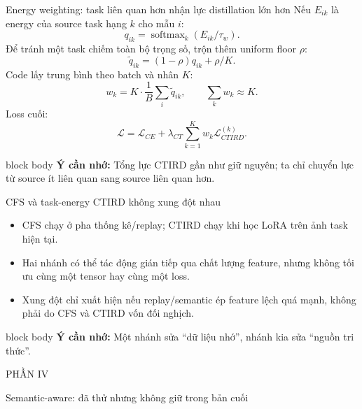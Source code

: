\documentclass[aspectratio=169,11pt]{beamer}
\newcommand{\remember}[1]{%
  \vfill
  \begin{beamercolorbox}[wd=\textwidth,sep=0.22cm,rounded=true]{block body}
    \textbf{Ý cần nhớ:} #1
  \end{beamercolorbox}
}
\newcommand{\sectionframe}[2]{%
  \begin{frame}[plain]
    \vfill
    {\large\color{HRMBlue}#1}\par\vspace{0.35cm}
    {\Huge\color{HRMDark}#2}\par
    \vfill
  \end{frame}
}
\begin{document}
\begin{frame}{Energy weighting: task liên quan hơn nhận lực distillation lớn hơn}
  Nếu $E_{ik}$ là energy của source task hạng $k$ cho mẫu $i$:
  \[
    q_{ik}=\operatorname{softmax}_k(E_{ik}/\tau_w).
  \]
  Để tránh một task chiếm toàn bộ trọng số, trộn thêm uniform floor $\rho$:
  \[
    \tilde q_{ik}=(1-\rho)q_{ik}+\rho/K.
  \]
  Code lấy trung bình theo batch và nhân $K$:
  \[
    w_k=K\cdot\frac{1}{B}\sum_i\tilde q_{ik},
    \qquad \sum_k w_k\approx K.
  \]
  Loss cuối:
  \[
    \mathcal L=\mathcal L_{CE}+\lambda_{CT}\sum_{k=1}^{K}w_k\mathcal L_{CTIRD}^{(k)}.
  \]
  \remember{Tổng lực CTIRD gần như giữ nguyên; ta chỉ chuyển lực từ source ít liên quan sang source liên quan hơn.}
\end{frame}

\begin{frame}{CFS và task-energy CTIRD không xung đột nhau}
  \centering

  \vspace{0.45cm}
  \begin{itemize}\setlength\itemsep{0.25cm}
    \item CFS chạy ở pha thống kê/replay; CTIRD chạy khi học LoRA trên ảnh task hiện tại.
    \item Hai nhánh có thể tác động gián tiếp qua chất lượng feature, nhưng không tối ưu cùng một tensor hay cùng một loss.
    \item Xung đột chỉ xuất hiện nếu replay/semantic ép feature lệch quá mạnh, không phải do CFS và CTIRD vốn đối nghịch.
  \end{itemize}
  \remember{Một nhánh sửa ``dữ liệu nhớ'', nhánh kia sửa ``nguồn tri thức''.}
\end{frame}

\sectionframe{PHẦN IV}{Semantic-aware: đã thử nhưng không giữ trong bản cuối}
\end{document}
